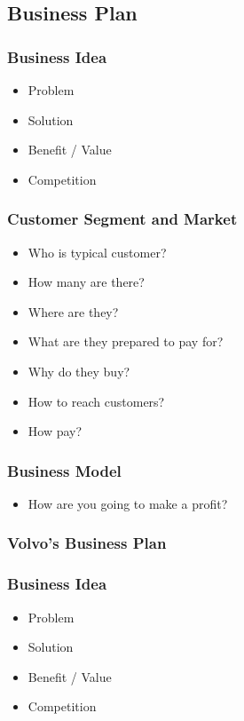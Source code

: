 \documentclass[conference]{IEEEtran}
\begin{document}
\subsection{Business Plan}
\subsubsection{Business Idea}
\begin{itemize}
	\item Problem
	\item Solution
	\item Benefit / Value
	\item Competition
\end{itemize}
\subsubsection{Customer Segment and Market}
\begin{itemize}
	\item Who is typical customer?
	\item How many are there?
	\item Where are they?
	\item  What are they prepared to pay for?
	\item Why do they buy?
	\item How to reach customers?
	\item How pay?
\end{itemize}
\subsubsection{Business Model}
\begin{itemize}
	\item How are you going to make a profit?
\end{itemize}
\subsubsection{Volvo's Business Plan}
\subsubsection{Business Idea}
\begin{itemize}
	\item Problem
	\item Solution
	\item Benefit / Value
	\item Competition
\end{itemize}
\end{document}
